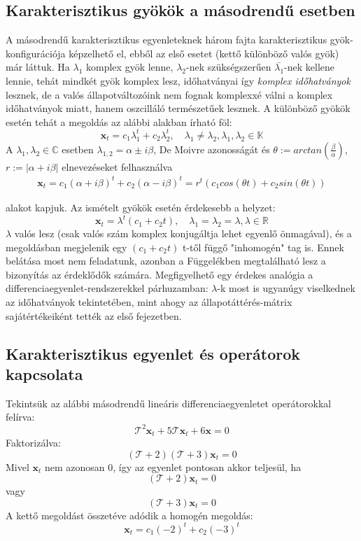 \documentclass[14p]{article}
\begin{document}
\subsection{Karakterisztikus gyökök a másodrendű esetben}

A másodrendű karakterisztikus egyenleteknek három fajta karakterisztikus gyök-konfigurációja képzelhető el, ebből az első esetet (kettő különböző valós gyök) már láttuk. Ha $\lambda_1$ komplex gyök lenne, $\lambda_2$-nek szükségszerűen $\bar{\lambda_1}$-nek kellene lennie, tehát mindkét gyök komplex lesz, időhatványai így \emph{komplex időhatványok} lesznek, de a valós állapotváltozóink nem fognak komplexxé válni a komplex időhatványok miatt, hanem oszcilláló természetűek lesznek. A különböző gyökök esetén tehát a megoldás az alábbi alakban írható föl:
\[
	\pmb{x}_t = c_1\lambda_1^t + c_2\lambda_2^t, \quad \lambda_1 \ne \lambda_2, \lambda_1, \lambda_2 \in \mathbb{K}
\]
A $\lambda_1, \lambda_2 \in \mathbb{C}$ esetben $\lambda_{1,2} = \alpha \pm i\beta$, De Moivre azonosságát és $\theta := arctan(\frac{\beta}{\alpha})$, $r := |\alpha + i\beta|$ elnevezéseket felhasználva
\begin{align*}
	\pmb{x}_t = c_1(\alpha + i\beta)^t + c_2(\alpha - i\beta)^t =  r^t(c_1 cos(\theta t) + c_2 sin(\theta t))
\end{align*}

alakot kapjuk. 
Az ismételt gyökök esetén érdekesebb a helyzet:
\[
	\pmb{x}_t = \lambda^t(c_1 + c_2t), \quad \lambda_1 = \lambda_2 = \lambda, \lambda \in \mathbb{R}
\]
$\lambda$ valós lesz (csak valós szám komplex konjugáltja lehet egyenlő önmagával), és a megoldásban megjelenik egy $(c_1 + c_2t)$ t-től függő "inhomogén" tag is. Ennek belátása most nem feladatunk, azonban a Függelékben megtalálható lesz a bizonyítás az érdeklődők számára. Megfigyelhető egy érdekes analógia a differenciaegyenlet-rendszerekkel párhuzamban: $\lambda$-k most is ugyanúgy viselkednek az időhatványok tekintetében, mint ahogy az állapotáttérés-mátrix sajátértékeiként tették az első fejezetben.

\subsection{Karakterisztikus egyenlet és operátorok kapcsolata}
Tekintsük az alábbi másodrendű lineáris differenciaegyenletet operátorokkal felírva:
\[
	\mathcal{T}^2\pmb{x}_t + 5\mathcal{T}\pmb{x}_t + 6\pmb{x} = 0
\]
Faktorizálva:
\[
	(\mathcal{T}+2)(\mathcal{T}+3)\pmb{x}_t = 0
\]
Mivel $\pmb{x}_t$ nem azonosan 0, így az egyenlet pontosan akkor teljesül, ha
\[
	(\mathcal{T}+2)\pmb{x}_t = 0
\]
vagy
\[
	(\mathcal{T}+3)\pmb{x}_t = 0
\]
A kettő megoldást összetéve adódik a homogén megoldás:
\[
	\pmb{x}_t = c_1(-2)^t + c_2(-3)^t
\]
\end{document}
